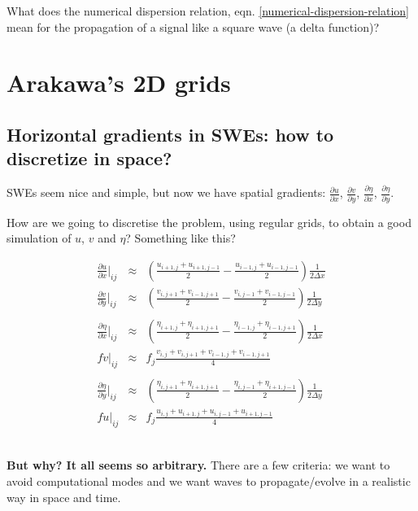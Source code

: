 \begin{exercise}
	What does the numerical dispersion relation, eqn. \ref{numerical-dispersion-relation} mean for the propagation of a signal like a square wave (a delta function)? 
\end{exercise}

\clearpage

\section{Arakawa's 2D grids}
\subsection { Horizontal gradients in SWEs: how to discretize in space?} 

SWEs seem nice and simple, but now we have spatial gradients: $\frac{\partial u}{\partial x}$, $\frac{\partial v}{\partial y}$, $\frac{\partial \eta}{\partial x}$, $\frac{\partial \eta}{\partial y}$.

How are we going to discretise the problem, using regular grids, to obtain a good simulation of $u$, $v$ and $\eta$? Something like this?

		\begin{eqnarray*}
			\frac{\partial u}{\partial x}\Big|_{ij} &\approx& \left(\frac{u_{i+1,j}+u_{i+1,j-1}}{2} - \frac{u_{i-1,j}+u_{i-1,j-1}}{2} \right)\frac{1}{2 \Delta x} \\
			\frac{\partial v}{\partial y}\Big|_{ij} &\approx& \left(\frac{v_{i,j+1}+v_{i-1,j+1}}{2} - \frac{v_{i,j-1}+v_{i-1,j-1}}{2} \right)\frac{1}{2 \Delta y} \\
			&& \\
			\frac{\partial \eta}{\partial x}\Big|_{ij} &\approx& \left(\frac{\eta_{i+1,j}+\eta_{i+1,j+1}}{2} - \frac{\eta_{i-1,j}+\eta_{i-1,j+1}}{2} \right)\frac{1}{2 \Delta x} \\
			f v\big|_{ij} &\approx& f_j \frac{v_{i,j}+v_{i,j+1}+v_{i-1,j}+v_{i-1,j+1}}{4} \\
			&& \nonumber \\
			\frac{\partial \eta}{\partial y}\Big|_{ij} &\approx& \left(\frac{\eta_{i,j+1}+\eta_{i+1,j+1}}{2} - \frac{\eta_{i,j-1}+\eta_{i+1,j-1}}{2} \right)\frac{1}{2 \Delta y} \\
			f u\big|_{ij} &\approx& f_j \frac{u_{i,j}+u_{i+1,j}+u_{i,j-1}+u_{i+1,j-1}}{4} \nonumber
		\end{eqnarray*}
~

{\bf But why? It all seems so arbitrary.} There are a few criteria: we want to avoid computational modes and we want waves to propagate/evolve in a realistic way in space and time.
